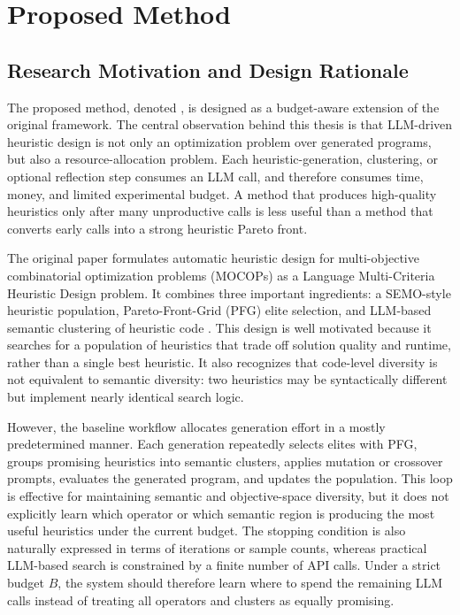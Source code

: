 \chapter{Proposed Method}

\providecommand{\methodcode}[1]{\code{#1}}

\section{Research Motivation and Design Rationale}

The proposed method, denoted \bmab{}, is designed as a budget-aware extension of the original \mpage{} framework. The central observation behind this thesis is that LLM-driven heuristic design is not only an optimization problem over generated programs, but also a resource-allocation problem. Each heuristic-generation, clustering, or optional reflection step consumes an LLM call, and therefore consumes time, money, and limited experimental budget. A method that produces high-quality heuristics only after many unproductive calls is less useful than a method that converts early calls into a strong heuristic Pareto front.

The original \mpage{} paper formulates automatic heuristic design for multi-objective combinatorial optimization problems (MOCOPs) as a Language Multi-Criteria Heuristic Design problem. It combines three important ingredients: a SEMO-style heuristic population, Pareto-Front-Grid (PFG) elite selection, and LLM-based semantic clustering of heuristic code \cite{ha2026mpage,laumanns2004semo}. This design is well motivated because it searches for a population of heuristics that trade off solution quality and runtime, rather than a single best heuristic. It also recognizes that code-level diversity is not equivalent to semantic diversity: two heuristics may be syntactically different but implement nearly identical search logic.

However, the baseline \mpage{} workflow allocates generation effort in a mostly predetermined manner. Each generation repeatedly selects elites with PFG, groups promising heuristics into semantic clusters, applies mutation or crossover prompts, evaluates the generated program, and updates the population. This loop is effective for maintaining semantic and objective-space diversity, but it does not explicitly learn which operator or which semantic region is producing the most useful heuristics under the current budget. The stopping condition is also naturally expressed in terms of iterations or sample counts, whereas practical LLM-based search is constrained by a finite number of API calls. Under a strict budget $B$, the system should therefore learn where to spend the remaining LLM calls instead of treating all operators and clusters as equally promising.

